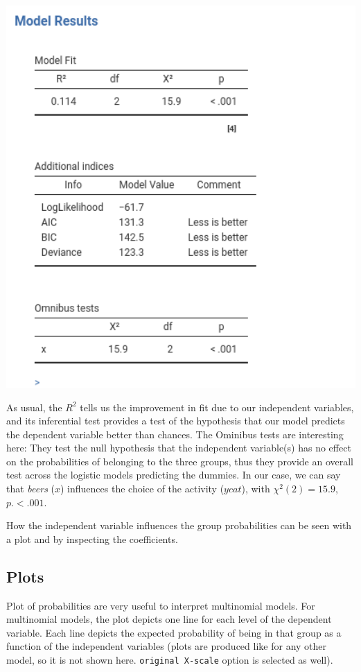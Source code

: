 \documentclass[
]{book}
\begin{document}
\includegraphics[width=5.82in]{bookletpics/3_multi_output3}

As usual, the \(R^2\) tells us the improvement in fit due to our independent variables, and its inferential test provides a test of the hypothesis that our model predicts the dependent variable better than chances. The Ominibus tests are interesting here: They test the null hypothesis that the independent variable(s) has no effect on the probabilities of belonging to the three groups, thus they provide an overall test across the logistic models predicting the dummies. In our case, we can say that \emph{beers} (\(x\)) influences the choice of the activity (\(ycat\)), with \(\chi^2(2)=15.9\), \(p.<.001\).

How the independent variable influences the group probabilities can be seen with a plot and by inspecting the coefficients.

\hypertarget{plots-2}{%
\subsection{Plots}\label{plots-2}}

Plot of probabilities are very useful to interpret multinomial models. For multinomial models, the plot depicts one line for each level of the dependent variable. Each line depicts the expected probability of being in that group as a function of the independent variables (plots are produced like for any other model, so it is not shown here. \texttt{original\ X-scale} option is selected as well).
\end{document}
